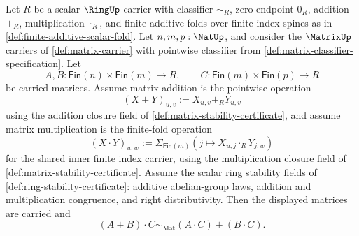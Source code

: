 \begin{theorem}
\label{thm:matrix-multiplication-right-distributes-over-addition}
Let $R$ be a scalar $\RingUp$ carrier with classifier $\sim_R$, zero endpoint $0_R$, addition $+_R$, multiplication $\cdot_R$, and finite additive folds over finite index spines as in \autoref{def:finite-additive-scalar-fold}. Let $n,m,p:\NatUp$, and consider the $\MatrixUp$ carriers of \autoref{def:matrix-carrier} with pointwise classifier from \autoref{def:matrix-classifier-specification}. Let
$$
A,B:\mathsf{Fin}(n)\times\mathsf{Fin}(m)\to R,
\qquad
C:\mathsf{Fin}(m)\times\mathsf{Fin}(p)\to R
$$
be carried matrices. Assume matrix addition is the pointwise operation
$$
(X+Y)_{u,v}:=X_{u,v}+_RY_{u,v}
$$
using the addition closure field of \autoref{def:matrix-stability-certificate}, and assume matrix multiplication is the finite-fold operation
$$
(X\cdot Y)_{u,w}:=\Sigma_{\mathsf{Fin}(m)}(j\mapsto X_{u,j}\cdot_RY_{j,w})
$$
for the shared inner finite index carrier, using the multiplication closure field of \autoref{def:matrix-stability-certificate}. Assume the scalar ring stability fields of \autoref{def:ring-stability-certificate}: additive abelian-group laws, addition and multiplication congruence, and right distributivity. Then the displayed matrices are carried and
$$
(A+B)\cdot C\sim_{\mathrm{Mat}}(A\cdot C)+(B\cdot C).
$$
\end{theorem}
